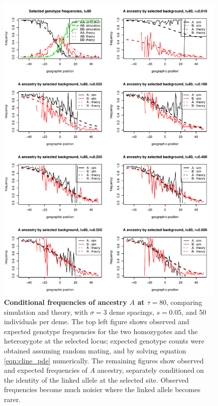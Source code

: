\begin{figure}
    \includegraphics{figs/cond_freqs_comparison_tau_80}
    \caption{
        \textbf{Conditional frequencies of ancestry $A$ at $\tau=80$},
        comparing simulation and theory, with $\sigma=3$ deme spacings, $s=0.05$, and 50 individuals per deme.
        The top left figure shows observed and expected genotype frequencies for the two homozygotes and the heterozygote at the selected locus;
        expected genotype counts were obtained assuming random mating,
        and by solving equation \eqref{eqn:cline_pde} numerically.
        The remaining figures show observed and expected frequencies of $A$ ancestry,
        separately conditioned on the identity of the linked allele at the selected site.
        Observed frequencies become much noisier where the linked allele becomes rarer.
    } \label{sfig:condAlleleFreq_tau80_comparison}
\end{figure}


